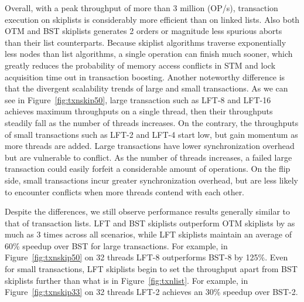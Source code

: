 \documentclass{sig-alternate-05-2015}
\begin{document}
Overall, with a peak throughput of more than 3 million (OP/s), transaction execution on skiplists is considerably more efficient than on linked lists.
Also both OTM and BST skiplists generates 2 orders or magnitude less spurious aborts than their list counterparts.
Because skiplist algorithms traverse exponentially less nodes than list algorithms, a single operation can finish much sooner, which greatly reduces the probability of memory access conflicts in STM and lock acquisition time out in transaction boosting.
Another noteworthy difference is that the divergent scalability trends of large and small transactions. 
As we can see in Figure~\ref{fig:txnskip50}, large transaction such as LFT-8 and LFT-16 achieves maximum throughputs on a single thread, then their throughputs steadily fall as the number of threads increases.
On the contrary, the throughputs of small transactions such as LFT-2 and LFT-4 start low, but gain momentum as more threads are added.
Large transactions have lower synchronization overhead but are vulnerable to conflict.
As the number of threads increases, a failed large transaction could easily forfeit a considerable amount of operations.
On the flip side, small transactions incur greater synchronization overhead, but are less likely to encounter conflicts when more threads contend with each other.

Despite the differences, we still observe performance results generally similar to that of transaction lists.
LFT and BST skiplists outperform OTM skiplists by as much as 3 times across all scenarios, while LFT skiplists maintain an average of 60\% speedup over BST for large transactions.
For example, in Figure~\ref{fig:txnskip50} on 32 threads LFT-8 outperforms BST-8 by 125\%.
Even for small transactions, LFT skiplists begin to set the throughput apart from BST skiplists further than what is in Figure~\ref{fig:txnlist}.
For example, in Figure~\ref{fig:txnskip33} on 32 threads LFT-2 achieves an 30\% speedup over BST-2.
\end{document}
